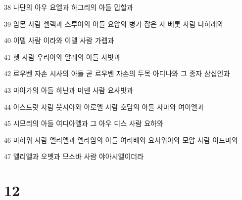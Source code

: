 \par 38 나단의 아우 요엘과 하그리의 아들 밉할과
\par 39 암몬 사람 셀렉과 스루야의 아들 요압의 병기 잡은 자 베롯 사람 나하래와
\par 40 이델 사람 이라와 이델 사람 가렙과
\par 41 헷 사람 우리아와 알래의 아들 사밧과
\par 42 르우벤 자손 시사의 아들 곧 르우벤 자손의 두목 아디나와 그 종자 삼십인과
\par 43 마아가의 아들 하난과 미덴 사람 요사밧과
\par 44 아스드랏 사람 웃시야와 아로엘 사람 호담의 아들 사마와 여이엘과
\par 45 시므리의 아들 여디아엘과 그 아우 디스 사람 요하와
\par 46 마하위 사람 엘리엘과 엘라암의 아들 여리배와 요사위야와 모압 사람 이드마와
\par 47 엘리엘과 오벳과 므소바 사람 야아시엘이더라

\chapter{12}

